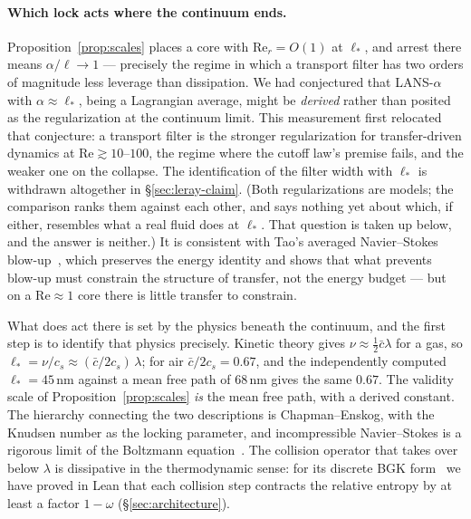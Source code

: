 \documentclass[11pt,a4paper]{article}
\begin{document}
\paragraph{Which lock acts where the continuum ends.}
Proposition~\ref{prop:scales} places a core with $\mathrm{Re}_r=O(1)$ at $\ell_*$, and arrest there
means $\alpha/\ell\to1$ --- precisely the regime in which a transport filter has two orders of
magnitude less leverage than dissipation. We had conjectured that LANS-$\alpha$ with
$\alpha\approx\ell_*$, being a Lagrangian average, might be \emph{derived} rather than posited as the
regularization at the continuum limit. This measurement first relocated that conjecture: a transport
filter is the stronger regularization for transfer-driven dynamics at $\mathrm{Re}\gtrsim10$--$100$,
the regime where the cutoff law's premise fails, and the weaker one on the collapse. The
identification of the filter width with $\ell_*$ is withdrawn altogether in \S\ref{sec:leray-claim}. (Both
regularizations are models; the comparison ranks them against each other, and says nothing yet
about which, if either, resembles what a real fluid does at $\ell_*$. That question is taken up
below, and the answer is neither.) It is consistent
with Tao's averaged Navier--Stokes blow-up~\cite{Tao2016}, which preserves the energy identity and
shows that what prevents blow-up must constrain the structure of transfer, not the energy budget ---
but on a $\mathrm{Re}\approx1$ core there is little transfer to constrain.

What does act there is set by the physics beneath the continuum, and the first step is to
identify that physics precisely. Kinetic theory gives $\nu\approx\tfrac12\bar c\lambda$ for a gas,
so $\ell_*=\nu/c_s\approx(\bar c/2c_s)\,\lambda$; for air $\bar c/2c_s=0.67$, and the independently
computed $\ell_*=45$\,nm against a mean free path of $68$\,nm gives the same $0.67$. The validity
scale of Proposition~\ref{prop:scales} \emph{is} the mean free path, with a derived constant. The
hierarchy connecting the two descriptions is Chapman--Enskog, with the Knudsen number as the locking
parameter, and incompressible Navier--Stokes is a rigorous limit of the Boltzmann
equation~\cite{GolseSaintRaymond2004}. The collision operator that takes over below $\lambda$ is
dissipative in the thermodynamic sense: for its discrete BGK form~\cite{BGK1954} we have proved in
Lean that each collision step contracts the relative entropy by at least a factor $1-\omega$
(\S\ref{sec:architecture}).
\end{document}
